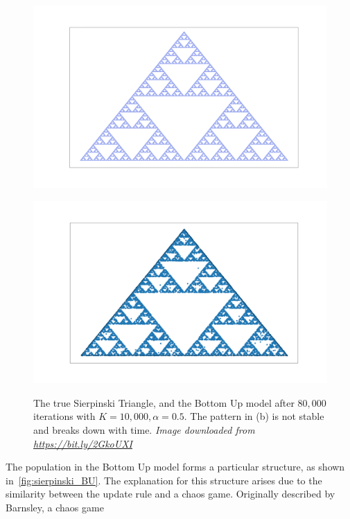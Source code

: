 \begin{figure}[H]
  \begin{minipage}[t]{0.49\textwidth}
    \includegraphics[width=\textwidth]{Images/Misc/Sierpinski_triangle_real_resized.png}
  \end{minipage}
  \hfill
 \begin{minipage}[t]{0.49\textwidth}
    \includegraphics[width=\textwidth]{Images/Figures/Barycenter/Serpinski_BU.png}
     \label{fig:sierpinski_BU}
 \end{minipage}
 \caption{ The true Sierpinski Triangle, and the Bottom Up model after $80,000$ iterations with $K=10,000, \alpha=0.5$. The pattern in (b) is not stable and breaks down with time. \textit{Image downloaded from \url{https://bit.ly/2GkoUXI}}  }\label{fig:sierpinski_compare}
\end{figure}


The population in the Bottom Up model forms a particular structure, as shown in~\cref{fig:sierpinski_BU}. The explanation for this structure arises due to the similarity between the update rule and a chaos game. Originally described by Barnsley, a chaos game

